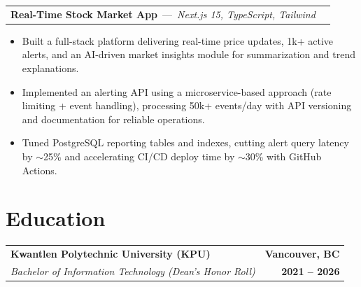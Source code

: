 \documentclass[11pt]{article}
\newcommand{\projectHeading}[3]{%
  \begin{tabularx}{\textwidth}{X r}
    \textbf{#1} \,---\, \textit{#2} & \textbf{#3} \\
  \end{tabularx}
}
\newcommand{\eduHeading}[4]{%
  \begin{tabularx}{\textwidth}{X r}
    \textbf{#1} & \textbf{#2} \\
    \textit{#3} & \textbf{#4} \\
  \end{tabularx}
}
\begin{document}
\projectHeading
{Real-Time Stock Market App}{Next.js 15, TypeScript, Tailwind}{}
\begin{itemize}
  \item Built a full-stack platform delivering real-time price updates, 1k+ active alerts, and an AI-driven market insights module for summarization and trend explanations.
  \item Implemented an alerting API using a microservice-based approach (rate limiting + event handling), processing 50k+ events/day with API versioning and documentation for reliable operations.
  \item Tuned PostgreSQL reporting tables and indexes, cutting alert query latency by \(\sim\)25\% and accelerating CI/CD deploy time by \(\sim\)30\% with GitHub Actions.
\end{itemize}

\section*{Education}
\eduHeading
{Kwantlen Polytechnic University (KPU)}{Vancouver, BC}
{Bachelor of Information Technology (Dean's Honor Roll)}{2021 -- 2026}
\end{document}
